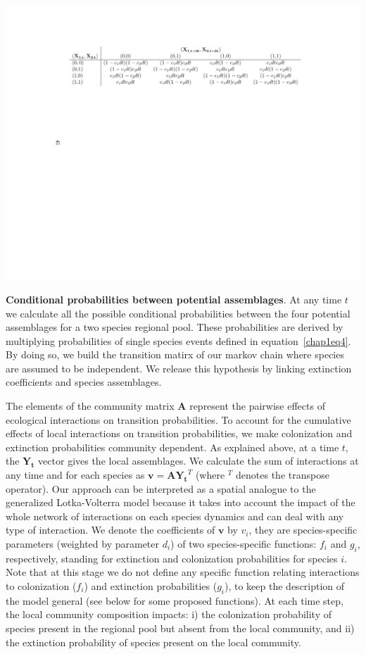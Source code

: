 \begin{table}[h!]
\centering
\includegraphics[scale=0.8]{./chapitre1/table1.pdf}
\caption[Conditional probabilities between potential assemblages]{\textbf{Conditional probabilities between potential assemblages}. At any time $t$ we calculate all the possible conditional probabilities between the four potential assemblages for a two species regional pool. These probabilities are derived by multiplying probabilities of single species events defined in equation~\eqref{chap1eq4}. By doing so, we build the transition matirx of our markov chain where species are assumed to be independent. We release this hypothesis by linking extinction coefficients and species assemblages.}
\label{tb1}
\end{table}

The elements of the community matrix $\mathbf{A}$ represent the pairwise effects of ecological interactions on transition probabilities. To account for the cumulative effects of local interactions on transition probabilities, we make colonization and extinction probabilities community dependent. As explained above, at a time $t$, the $\mathbf{Y_t}$ vector gives the local assemblages. We calculate the sum of interactions at any time and for each species as $\mathbf{v}=\mathbf{A}\mathbf{Y_t}^T$ (where $^T$ denotes the transpose operator). Our approach can be interpreted as a spatial analogue to the generalized Lotka-Volterra model because it takes into account the impact of the whole network of interactions on each species dynamics and can deal with any type of interaction. We denote the coefficients of $\mathbf{v}$ by $v_i$, they are species-specific parameters (weighted by parameter $d_i$) of two species-specific functions: $f_i$ and $g_i$, respectively, standing for extinction and colonization probabilities for species $i$. Note that at this stage we do not define any specific function relating interactions to colonization ($f_i$) and extinction probabilities ($g_i$), to keep the description of the model general (see below for some proposed functions). At each time step, the local community composition impacts: i) the colonization probability of species present in the regional pool but absent from the local community, and ii) the extinction probability of species present on the local community.

